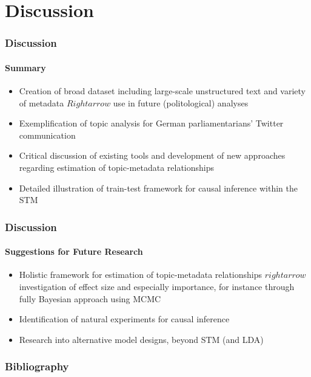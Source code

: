 \documentclass[xcolor=dvipsnames]{beamer}
\begin{document}
\section{Discussion}
\begin{frame}
\frametitle{Discussion}
\framesubtitle{Summary}
\begin{itemize}
\item Creation of broad dataset including large-scale unstructured text and variety of metadata $Rightarrow$ use in future (politological) analyses
\item Exemplification of topic analysis for German parliamentarians' Twitter communication
\item Critical discussion of existing tools and development of new approaches regarding estimation of topic-metadata relationships
\item Detailed illustration of train-test framework for causal inference within the STM
\end{itemize}
\end{frame}

\begin{frame}
\frametitle{Discussion}
\framesubtitle{Suggestions for Future Research}
\begin{itemize}
\item Holistic framework for estimation of topic-metadata relationships $rightarrow$ investigation of effect size and especially importance, for instance through fully Bayesian approach using MCMC
\item Identification of natural experiments for causal inference
\item Research into alternative model designs, beyond STM (and LDA)
\end{itemize}
\end{frame}

\begin{frame}
\frametitle{Bibliography}
\printbibliography
\end{frame}
\end{document}
